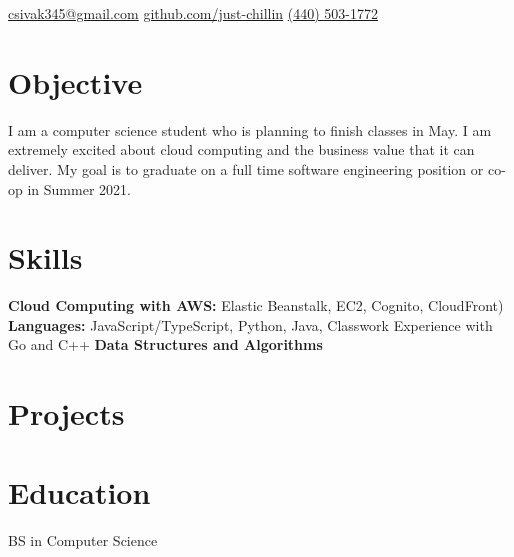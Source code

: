 \documentclass{cv}
\begin{document}
	
	\contact
		{\faEnvelopeSquare\space\href{mailto:csivak345@gmail.com}{csivak345@gmail.com}}
		{\faGithub\space\url{github.com/just-chillin}}
		{\faPhone\space\href{tel:14405031772}{(440) 503-1772}}
	
	\section{Objective}
	\begin{flushleft}
		I am a computer science student who is planning to finish classes in May. I am extremely excited about cloud computing and the business value that it can deliver. My goal is to graduate on a full time software engineering position or co-op in Summer 2021.
	\end{flushleft}

	
	\section{Skills}
	\textbf{Cloud Computing with AWS:} Elastic Beanstalk, EC2, Cognito, CloudFront)\newline
	\textbf{Languages:} JavaScript/TypeScript, Python, Java, Classwork Experience with Go and C++\newline
	\textbf{Data Structures and Algorithms}
	
	\section{Projects}
	

	\section{Education}
	BS in Computer Science
\end{document}
